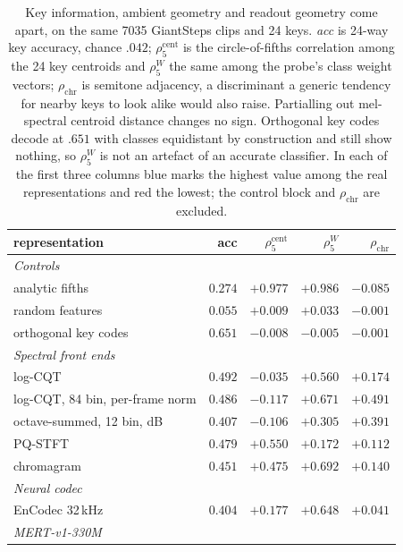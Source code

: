 \begin{table}[t]
\centering
\footnotesize
\setlength{\tabcolsep}{3pt}
\caption{Key information, ambient geometry and readout geometry come apart, on the same 7035 GiantSteps clips and 24 keys. \textit{acc} is 24-way key accuracy, chance $.042$; $\rho^{\text{cent}}_{5}$ is the circle-of-fifths correlation among the 24 key centroids and $\rho^{W}_{5}$ the same among the probe's class weight vectors; $\rho_{\text{chr}}$ is semitone adjacency, a discriminant a generic tendency for nearby keys to look alike would also raise. Partialling out mel-spectral centroid distance changes no sign. Orthogonal key codes decode at $.651$ with classes equidistant by construction and still show nothing, so $\rho^{W}_{5}$ is not an artefact of an accurate classifier. In each of the first three columns blue marks the highest value among the real representations and red the lowest; the control block and $\rho_{\text{chr}}$ are excluded.}
\label{tab:decodable-vs-geometric}
\begin{tabular}{l r r r r}
\toprule
representation & acc & $\rho^{\text{cent}}_{5}$ & $\rho^{W}_{5}$ & $\rho_{\text{chr}}$ \\
\midrule
\multicolumn{5}{l}{\textit{Controls}} \\
\quad analytic fifths & $0.274$ & $+0.977$ & $+0.986$ & $-0.085$ \\
\quad random features & $0.055$ & $+0.009$ & $+0.033$ & $-0.001$ \\
\quad orthogonal key codes & $0.651$ & $-0.008$ & $-0.005$ & $-0.001$ \\
\multicolumn{5}{l}{\textit{Spectral front ends}} \\
\quad log-CQT & \textcolor{hi}{$\mathbf{0.492}$} & $-0.035$ & $+0.560$ & $+0.174$ \\
\quad log-CQT, 84 bin, per-frame norm & $0.486$ & \textcolor{lo}{$\mathbf{-0.117}$} & $+0.671$ & $+0.491$ \\
\quad octave-summed, 12 bin, dB & $0.407$ & $-0.106$ & $+0.305$ & $+0.391$ \\
\quad PQ-STFT & $0.479$ & \textcolor{hi}{$\mathbf{+0.550}$} & $+0.172$ & $+0.112$ \\
\quad chromagram & $0.451$ & $+0.475$ & \textcolor{hi}{$\mathbf{+0.692}$} & $+0.140$ \\
\multicolumn{5}{l}{\textit{Neural codec}} \\
\quad EnCodec 32\,kHz & \textcolor{lo}{$\mathbf{0.404}$} & $+0.177$ & $+0.648$ & $+0.041$ \\
\multicolumn{5}{l}{\textit{MERT-v1-330M}} \\

\end{tabular}
\end{table}
